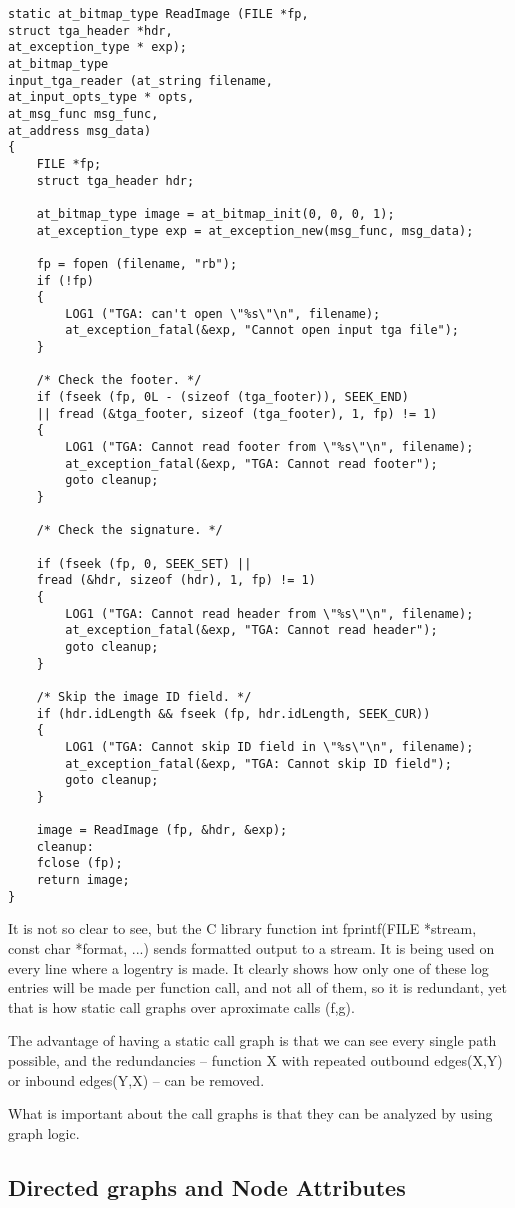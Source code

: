 \begin{lstlisting}
static at_bitmap_type ReadImage (FILE *fp,
struct tga_header *hdr,
at_exception_type * exp);
at_bitmap_type
input_tga_reader (at_string filename,
at_input_opts_type * opts,
at_msg_func msg_func, 
at_address msg_data)
{
	FILE *fp;
	struct tga_header hdr;
	
	at_bitmap_type image = at_bitmap_init(0, 0, 0, 1);
	at_exception_type exp = at_exception_new(msg_func, msg_data);
	
	fp = fopen (filename, "rb");
	if (!fp)
	{
		LOG1 ("TGA: can't open \"%s\"\n", filename);
		at_exception_fatal(&exp, "Cannot open input tga file");
	}
	
	/* Check the footer. */
	if (fseek (fp, 0L - (sizeof (tga_footer)), SEEK_END)
	|| fread (&tga_footer, sizeof (tga_footer), 1, fp) != 1)
	{
		LOG1 ("TGA: Cannot read footer from \"%s\"\n", filename);
		at_exception_fatal(&exp, "TGA: Cannot read footer");
		goto cleanup;
	}
	
	/* Check the signature. */
	
	if (fseek (fp, 0, SEEK_SET) ||
	fread (&hdr, sizeof (hdr), 1, fp) != 1)
	{
		LOG1 ("TGA: Cannot read header from \"%s\"\n", filename);
		at_exception_fatal(&exp, "TGA: Cannot read header");
		goto cleanup;
	}
	
	/* Skip the image ID field. */
	if (hdr.idLength && fseek (fp, hdr.idLength, SEEK_CUR))
	{
		LOG1 ("TGA: Cannot skip ID field in \"%s\"\n", filename);
		at_exception_fatal(&exp, "TGA: Cannot skip ID field");
		goto cleanup;
	}
	
	image = ReadImage (fp, &hdr, &exp);
	cleanup:  
	fclose (fp);
	return image;
}
\end{lstlisting}

It is not so clear to see, but the C library function int fprintf(FILE *stream, const char *format, ...) sends formatted output to a stream. It is being used on every line where a logentry is made. It clearly shows how only one of these log entries will be made per function call, and not all of them, so it is redundant, yet that is how static call graphs over aproximate calls (f,g).

The advantage of having a static call graph is that we can see every single path possible, and the redundancies -- function X with repeated outbound edges(X,Y) or inbound edges(Y,X) -- can be removed.

What is important about the call graphs is that they can be analyzed by using graph logic.

\subsection{Directed graphs and Node Attributes}

